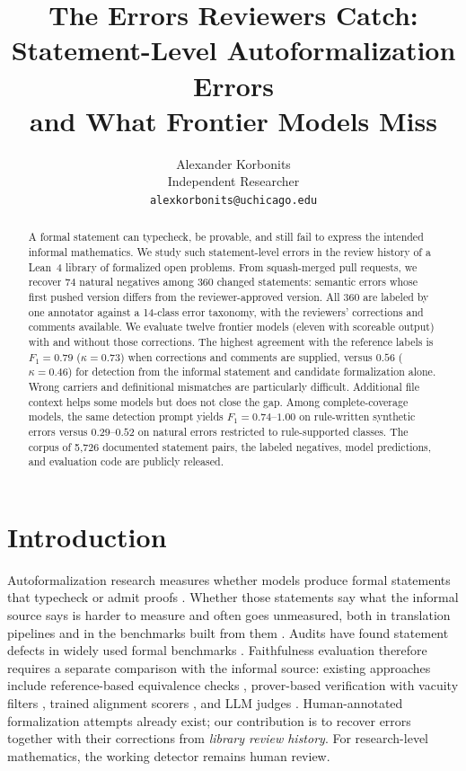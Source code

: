 \documentclass{article}
\title{The Errors Reviewers Catch:\\
Statement-Level Autoformalization Errors\\
and What Frontier Models Miss}
\author{Alexander Korbonits \\
Independent Researcher \\
\texttt{alexkorbonits@uchicago.edu}}
\begin{document}
\maketitle
\begin{abstract}
A formal statement can typecheck, be provable, and still fail to express the
intended informal mathematics. We study such statement-level errors in the
review history of a Lean~4 library of formalized open problems. From
squash-merged pull requests, we recover 74 natural negatives among 360
changed statements: semantic errors whose first pushed version differs from
the reviewer-approved version. All 360 are labeled by one annotator
against a 14-class error taxonomy, with the reviewers' corrections and
comments available. We evaluate twelve frontier models (eleven with
scoreable output) with and without those corrections. The highest agreement
with the reference labels is $F_1=0.79$ ($\kappa=0.73$) when corrections
and comments are supplied, versus $0.56$ ($\kappa=0.46$) for detection from the informal
statement and candidate formalization alone. Wrong carriers and definitional
mismatches are particularly difficult. Additional file context helps some
models but does not close the gap. Among complete-coverage models, the same detection prompt yields
$F_1=0.74$--$1.00$ on rule-written synthetic errors versus $0.29$--$0.52$
on natural errors restricted to rule-supported classes. The corpus of 5{,}726
documented statement pairs, the labeled negatives, model predictions, and evaluation code are publicly released.
\end{abstract}

\section{Introduction}
Autoformalization research measures whether models produce formal statements
that typecheck or admit proofs
\citep{wu2022autoformalization,azerbayev2023proofnet,ying2024leanworkbook}.
Whether those statements say what the informal source says is harder to
measure and often goes unmeasured, both in translation pipelines and in the
benchmarks built from them \citep{minif2f,tsoukalas2024putnambench}. Audits
have found statement defects in widely used formal benchmarks
\citep{ammanamanchi2026faults}. Faithfulness evaluation therefore
requires a separate comparison with the informal source: existing approaches
include reference-based equivalence checks \citep{poiroux2025reliable},
prover-based verification with vacuity filters \citep{zhou2024dont},
trained alignment scorers \citep{lu2024formalalign}, and LLM judges
\citep{zhang2026beyond}. Human-annotated formalization attempts already exist;
our contribution is to recover errors together with their corrections from
\emph{library review history}. For research-level mathematics, the working
detector remains human review.
\end{document}
